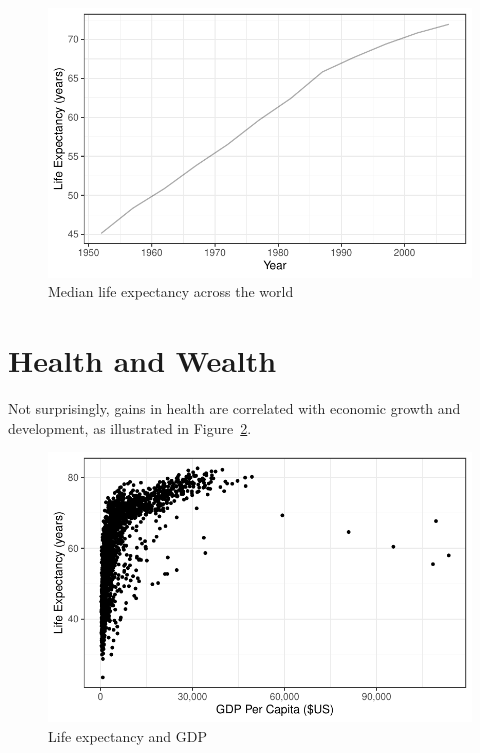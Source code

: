 \documentclass[
  letterpaper,
  DIV=11,
  numbers=noendperiod]{scrreport}
\theoremstyle{definition}
\theoremstyle{remark}
\begin{document}
\begin{figure}

{\centering \includegraphics{index_files/figure-pdf/fig-life-exp-1.pdf}

}

\caption{\label{fig-life-exp}Median life expectancy across the world}

\end{figure}

\hypertarget{health-and-wealth}{%
\section*{Health and Wealth}\label{health-and-wealth}}


Not surprisingly, gains in health are correlated with economic growth
and development, as illustrated in Figure~\ref{fig-life-exp-gdp}.

\begin{figure}

{\centering \includegraphics{index_files/figure-pdf/fig-life-exp-gdp-1.pdf}

}

\caption{\label{fig-life-exp-gdp}Life expectancy and GDP}

\end{figure}
\end{document}

